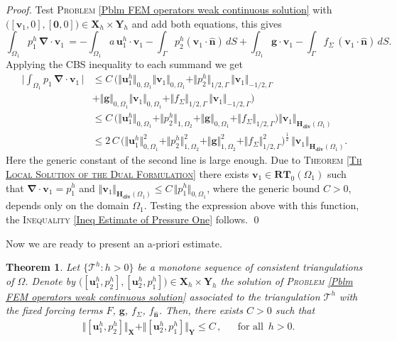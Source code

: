 \documentclass[3p]{elsarticle}
\newtheorem{theorem}{Theorem}
\def\X{\mathbf X}
\def\Y{\mathbf Y}
\def\0{\mathbf 0}
\def\g{\mathbf g}
\def\n{\bm{\widehat{ n} } }
\def\div{\bm{\nabla} \cdot}
\def\uoneh{\mathbf{u}_{1}^{h}}
\def\utwoh{\mathbf{u}_{2}^{h}}
\def\Hdiv{\mathbf{H_{div}}}
\def\vone{\mathbf{v}_{1}}
\def\pone{p_{1}}
\def\poneh{p_{1}^{h}}
\def\ptwoh{p_{2}^{h}}
\def\flux{f_{\bm{\hat{n}} } }
\def\stress{f_{\Sigma } }
\def\triang{\mathcal{T}}
\begin{document}
%
\begin{proof}
Test \textsc{Problem} \eqref{Pblm FEM operators weak continuous solution} with $\big([\vone, 0],[\0, 0]\big)\in \X_{h} \times \Y_{h}$ and add both equations, this gives
\begin{equation}\label{Eq Test for Isolating pone}
\int_{\Omega_1} \poneh \,\div\vone\,
=
-\int_{\Omega_1}  a \, \uoneh \cdot \vone 
-\int_{\,\Gamma}\ptwoh \left(\vone\cdot\n\right)\, d S 
+ \int_{\Omega_{1}} \g \cdot \vone
- \int_{\Gamma} \stress\, (\vone\cdot\n)\, dS  .
\end{equation}
%
Applying the CBS inequality to each summand we get
\begin{equation*}%
%
\begin{split}
\Big\vert\int_{\Omega_1} \pone \,\div\vone\,\Big\vert
& \leq
C \, \big(\Vert \uoneh \Vert_{0, \Omega_{1}} \Vert \vone \Vert_{0, \Omega_{1}} 
+ \Vert \ptwoh \Vert_{1/2, \Gamma} \, \Vert \vone \Vert_{-1/2, \Gamma}  \\
%
& + \Vert \g \Vert_{0, \Omega_{1}} \Vert \vone \Vert_{0, \Omega_{1}}  
+ \Vert \stress \Vert_{1/2, \Gamma} \, \Vert \vone \Vert_{-1/2, \Gamma}  
\big)
\\
%
& \leq 
C \, \big(\Vert \uoneh \Vert_{0, \Omega_{1}} 
+ \Vert \ptwoh \Vert_{1, \Omega_{2}} 
+ \Vert \g \Vert_{0, \Omega_{1}} 
+ \Vert \stress \Vert_{1/2, \Gamma} 
\big) \Vert \vone \Vert_{\Hdiv(\Omega_{1})} \\
%
& \leq 2 \,  C\, \big(\Vert \uoneh \Vert_{0, \Omega_{1}}^{2}
      + \Vert \ptwoh \Vert_{1, \Omega_{2}}^{2}
      + \Vert \g \Vert_{1, \Omega_{2}}^{2}
      + \Vert \stress \Vert_{1/2, \Gamma}^{2}
      \big)^{\tfrac{1}{2}} \, \Vert \vone \Vert_{\Hdiv(\Omega_{1})} .  
\end{split}
%
\end{equation*}
%
Here the generic constant of the second line is large enough. 
Due to \textsc{Theorem \ref{Th Local Solution of the Dual Formulation}} there exists $\vone\in \mathbf{RT}_{0}(\Omega_{1})$ such that $\div \vone = \poneh$ and $\Vert \vone \Vert_{\Hdiv(\Omega_{1})} \leq C\, \Vert \poneh \Vert_{0, \Omega_{1}}$, where the generic bound $C > 0$, depends only on the domain $\Omega_{1}$. Testing the expression above with this function, the \textsc{Inequality} \eqref{Ineq Estimate of Pressure One} follows.
   \qed
\end{proof}
%
Now we are ready to present an a-priori estimate.
%
%
\begin{theorem}\label{Th a-priori Estimates}
Let $\{\triang^{h}: h>0\}$ be a monotone sequence of consistent triangulations of $\Omega$. Denote by $\big([\uoneh, \ptwoh],[\utwoh, \poneh]\big)\in \X_{h}\times \Y_{h}$ the solution of \textsc{Problem} \eqref{Pblm FEM operators weak continuous solution} associated to the triangulation $\triang^{h}$ with the fixed forcing terms $F$, $\g$, $\stress$, $\flux$. Then, there exists $C>0$ such that 
%
\begin{align}\label{Ineq Uniform Boundedness}
& \Vert[\uoneh, \ptwoh]\Vert_{\X}+\Vert [\utwoh, \poneh]\Vert_{\Y} \leq C \, ,&
& \text{for all }\, h > 0 .
\end{align}
%
\end{theorem}
\end{document}
